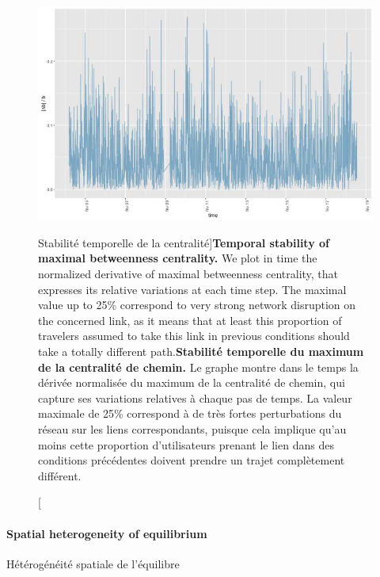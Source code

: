\begin{figure}
\includegraphics[width=\linewidth]{Figures/Final/8-1-2-fig-transportationequilibrium-fig-4.jpg}
\caption[Temporal stability of centrality][Stabilité temporelle de la centralité]{\textbf{Temporal stability of maximal betweenness centrality.} We plot in time the normalized derivative of maximal betweenness centrality, that expresses its relative variations at each time step. The maximal value up to 25\% correspond to very strong network disruption on the concerned link, as it means that at least this proportion of travelers assumed to take this link in previous conditions should take a totally different path.\label{fig:transportationequilibrium:fig-4}}{\textbf{Stabilité temporelle du maximum de la centralité de chemin.} Le graphe montre dans le temps la dérivée normalisée du maximum de la centralité de chemin, qui capture ses variations relatives à chaque pas de temps. La valeur maximale de 25\% correspond à de très fortes perturbations du réseau sur les liens correspondants, puisque cela implique qu'au moins cette proportion d'utilisateurs prenant le lien dans des conditions précédentes doivent prendre un trajet complètement différent.\label{fig:transportationequilibrium:fig-4}}
\end{figure}




\paragraph{Spatial heterogeneity of equilibrium}{Hétérogénéité spatiale de l'équilibre}



